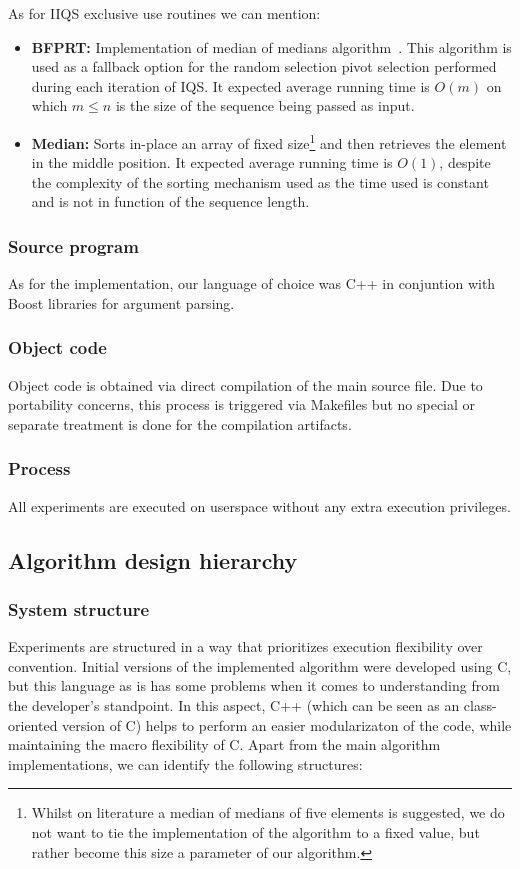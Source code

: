 As for IIQS exclusive use routines we can mention:
\begin{itemize}
    \item \textbf{BFPRT:} Implementation of median of medians algorithm~\cite{Blum_Floyd_Pratt_Rivest_Tarjan_1973}. This algorithm is used as a fallback option for the random selection pivot selection performed during each iteration of IQS. It expected average running time is $O(m)$ on which $m \leq n$ is the size of the sequence being passed as input.
    \item \textbf{Median:} Sorts in-place an array of fixed size\footnote{Whilst on literature a median of medians of five elements is suggested, we do not want to tie the implementation of the algorithm to a fixed value, but rather become this size a parameter of our algorithm.} and then retrieves the element in the middle position. It expected average running time is $O(1)$, despite the complexity of the sorting mechanism used as the time used is constant and is not in function of the sequence length.
\end{itemize}

\subsubsection{Source program}
As for the implementation, our language of choice was C++ in conjuntion with Boost libraries for argument parsing. 

\subsubsection{Object code}
Object code is obtained via direct compilation of the main source file. Due to portability concerns, this process is triggered via Makefiles but no special or separate treatment is done for the compilation artifacts.

\subsubsection{Process}
All experiments are executed on userspace without any extra execution privileges.

\subsection{Algorithm design hierarchy}

\subsubsection{System structure}
Experiments are structured in a way that prioritizes execution flexibility over convention. Initial versions of the implemented algorithm were developed using C, but this language as is has some problems when it comes to understanding from the developer's standpoint. In this aspect, C++ (which can be seen as an class-oriented version of C) helps to perform an easier modularizaton of the code, while maintaining the macro flexibility of C. Apart from the main algorithm implementations, we can identify the following structures:

